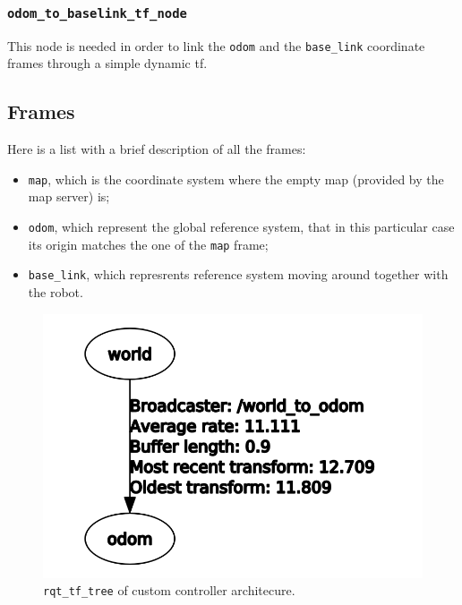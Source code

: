 \documentclass[11pt,a4paper]{article}
\begin{document}
\subsubsection{\texttt{odom\_to\_baselink\_tf\_node}}

This node is needed in order to link the \texttt{odom} and the \texttt{base\_link} coordinate frames through a simple dynamic tf.

\subsection{Frames}

Here is a list with a brief description of all the frames:
\begin{itemize}
 \item \texttt{map}, which is the coordinate system where the empty map (provided by the map server) is;
 \item \texttt{odom}, which represent the global reference system, that in this particular case its origin matches the one of the \texttt{map} frame;
 \item \texttt{base\_link}, which represrents reference system moving around together with the robot.
\end{itemize}

\begin{figure}[H]
    \centering
    \includegraphics[scale=0.3]{ros_tools/rqttftree_custom.png}
    \caption{\texttt{rqt\_tf\_tree} of custom controller architecure.}
\end{figure}
\end{document}
